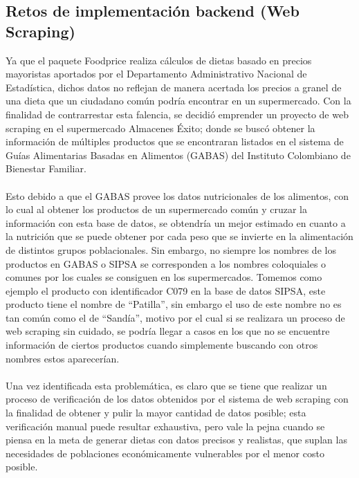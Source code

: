 \subsection{Retos de implementaci\'on backend (Web Scraping)}
\noindent Ya que el paquete Foodprice realiza c\'alculos de dietas basado en precios mayoristas aportados por el Departamento Administrativo Nacional de Estad\'istica, dichos datos no reflejan de manera acertada los precios a granel de una dieta que un ciudadano com\'un podr\'ia encontrar en un supermercado. Con la finalidad de contrarrestar esta falencia, se decidi\'o emprender un proyecto de web scraping en el supermercado Almacenes \'Exito; donde se busc\'o obtener la informaci\'on de m\'ultiples productos que se encontraran listados en el sistema de Gu\'ias Alimentarias Basadas en Alimentos (GABAS) del Instituto Colombiano de Bienestar Familiar.
\\
\\
Esto debido a  que el GABAS provee los datos nutricionales de los alimentos, con lo cual al obtener los productos de un supermercado com\'un y cruzar la informaci\'on con esta base de datos, se obtendr\'ia un mejor estimado en cuanto a la nutrici\'on que se puede obtener por cada peso que se invierte en la alimentaci\'on de distintos grupos poblacionales. Sin embargo, no siempre los nombres de los productos en GABAS o SIPSA se corresponden a los nombres coloquiales o comunes por los cuales se consiguen en los supermercados. Tomemos como ejemplo el producto con identificador C079 en la base de datos SIPSA, este producto tiene el nombre de ``Patilla'', sin embargo el uso de este nombre no es tan com\'un como el de ``Sand\'ia'', motivo por el cual si se realizara un proceso de web scraping sin cuidado, se podr\'ia llegar a casos en los que no se encuentre informaci\'on de ciertos productos cuando simplemente buscando con otros nombres estos aparecer\'ian.
\\
\\
Una vez identificada esta problem\'atica, es claro que se tiene que realizar un proceso de verificaci\'on de los datos obtenidos por el sistema de web scraping con la finalidad de obtener y pulir la mayor cantidad de datos posible; esta verificaci\'on manual puede resultar exhaustiva, pero vale la pejna cuando se piensa en la meta de generar dietas con datos precisos y realistas, que suplan las necesidades de poblaciones econ\'omicamente vulnerables por el menor costo posible.





